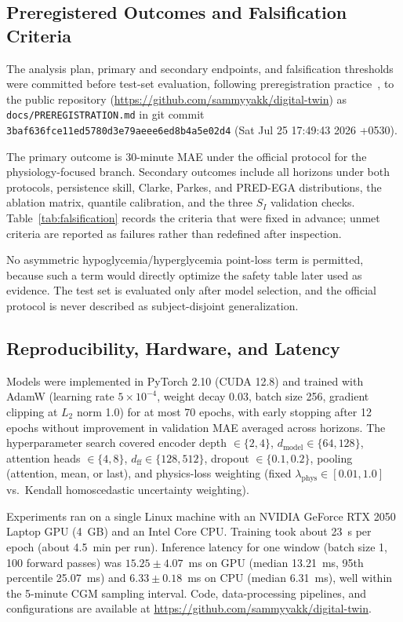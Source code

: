 \documentclass[journal]{IEEEtran}
\begin{document}
\subsection{Preregistered Outcomes and Falsification Criteria}

The analysis plan, primary and secondary endpoints, and falsification thresholds were committed before test-set evaluation, following preregistration practice~\cite{ref79}, to the public repository (\url{https://github.com/sammyyakk/digital-twin}) as \texttt{docs/PREREGISTRATION.md} in git commit \texttt{3baf636fce11ed5780d3e79aeee6ed8b4a5e02d4} (Sat Jul 25 17:49:43 2026 +0530).

The primary outcome is 30-minute MAE under the official protocol for the physiology-focused branch. Secondary outcomes include all horizons under both protocols, persistence skill, Clarke, Parkes, and PRED-EGA distributions, the ablation matrix, quantile calibration, and the three $S_I$ validation checks. Table~\ref{tab:falsification} records the criteria that were fixed in advance; unmet criteria are reported as failures rather than redefined after inspection.

No asymmetric hypoglycemia/hyperglycemia point-loss term is permitted, because such a term would directly optimize the safety table later used as evidence. The test set is evaluated only after model selection, and the official protocol is never described as subject-disjoint generalization.

\subsection{Reproducibility, Hardware, and Latency}

Models were implemented in PyTorch 2.10 (CUDA 12.8) and trained with AdamW (learning rate $5 \times 10^{-4}$, weight decay 0.03, batch size 256, gradient clipping at $L_2$ norm 1.0) for at most 70 epochs, with early stopping after 12 epochs without improvement in validation MAE averaged across horizons. The hyperparameter search covered encoder depth $\in \{2, 4\}$, $d_{\text{model}} \in \{64, 128\}$, attention heads $\in \{4, 8\}$, $d_{\text{ff}} \in \{128, 512\}$, dropout $\in \{0.1, 0.2\}$, pooling (attention, mean, or last), and physics-loss weighting (fixed $\lambda_{\text{phys}} \in [0.01, 1.0]$ vs.\ Kendall homoscedastic uncertainty weighting).

Experiments ran on a single Linux machine with an NVIDIA GeForce RTX 2050 Laptop GPU (4~GB) and an Intel Core CPU. Training took about 23~s per epoch (about 4.5~min per run). Inference latency for one window (batch size 1, 100 forward passes) was $15.25 \pm 4.07$~ms on GPU (median 13.21~ms, 95th percentile 25.07~ms) and $6.33 \pm 0.18$~ms on CPU (median 6.31~ms), well within the 5-minute CGM sampling interval. Code, data-processing pipelines, and configurations are available at \url{https://github.com/sammyyakk/digital-twin}.
\end{document}
